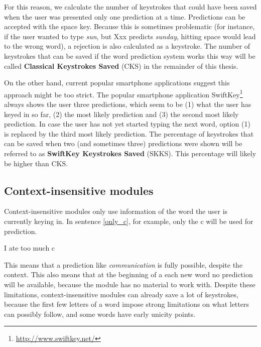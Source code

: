 \documentclass[11pt]{article}
\begin{document}
For this reason, we calculate the number of keystrokes that could have been saved when the user was presented only one prediction at a time. Predictions can be accepted with the space key. Because this is sometimes problematic (for instance, if the user wanted to type \emph{sun}, but Xxx predicts \emph{sunday}, hitting space would lead to the wrong word), a rejection is also calculated as a keystroke. The number of keystrokes that can be saved if the word prediction system works this way will be called \textbf{Classical Keystrokes Saved} (CKS) in the remainder of this thesis.

On the other hand, current popular smartphone applications suggest this approach might be too strict. The popular smartphone application SwiftKey\footnote{\url{http://www.swiftkey.net/}} always shows the user three predictions, which seem to be (1) what the user has keyed in so far, (2) the most likely prediction and (3) the second most likely prediction. In case the user has not yet started typing the next word, option (1) is replaced by the third most likely prediction. The percentage of keystrokes that can be saved when two (and sometimes three) predictions were shown will be referred to as \textbf{SwiftKey Keystrokes Saved} (SKKS). This percentage will likely be higher than CKS.

\subsection{Context-insensitive modules} \label{ci}

Context-insensitive modules only use information of the word the user is currently keying in. In sentence \ref{only_c}, for example, only the c will be used for prediction. 

\begin{examples}
\item I ate too much c \label{only_c}
\end{examples}

This means that a prediction like \emph{communication} is fully possible, despite the context. This also means that at the beginning of a each new word no prediction will be available, because the module has no material to work with. Despite these limitations, context-insensitive modules can already save a lot of keystrokes, because the first few letters of a word impose strong limitations on what letters can possibly follow, and some words have early unicity points.
\end{document}
